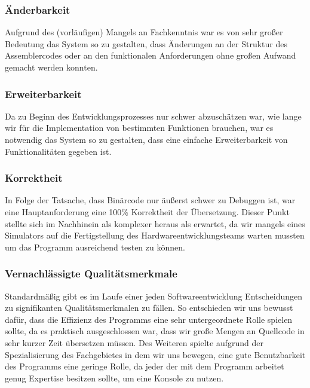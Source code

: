 \documentclass[paper=a4,fontsize=12pt]{scrreprt}
\begin{document}
\subsubsection{Änderbarkeit}
Aufgrund des (vorläufigen) Mangels an Fachkenntnis war es von sehr großer Bedeutung das System so zu gestalten, dass Änderungen an der Struktur des Assemblercodes oder an den funktionalen Anforderungen ohne großen Aufwand gemacht werden konnten. 

\subsubsection{Erweiterbarkeit}
Da zu Beginn des Entwicklungsprozesses nur schwer abzuschätzen war, wie lange wir für die Implementation von bestimmten Funktionen brauchen, war es notwendig das System so zu gestalten, dass eine einfache Erweiterbarkeit von Funktionalitäten gegeben ist. 

\subsubsection{Korrektheit}
In Folge der Tatsache, dass Binärcode nur äußerst schwer zu Debuggen ist, war eine Hauptanforderung eine 100\% Korrektheit der Übersetzung. Dieser Punkt stellte sich im Nachhinein als komplexer heraus als erwartet, da wir mangels eines Simulators auf die Fertigstellung des Hardwareentwicklungsteams warten mussten um das Programm ausreichend testen zu können. 

\subsubsection{Vernachlässigte Qualitätsmerkmale}
Standardmäßig gibt es im Laufe einer jeden Softwareentwicklung Entscheidungen zu signifikanten Qualitätsmerkmalen zu fällen. So entschieden wir uns bewusst dafür, dass die Effizienz des Programms eine sehr untergeordnete Rolle spielen sollte, da es praktisch ausgeschlossen war, dass wir große Mengen an Quellcode in sehr kurzer Zeit übersetzen müssen. Des Weiteren spielte aufgrund der Spezialisierung des Fachgebietes in dem wir uns bewegen, eine gute Benutzbarkeit des Programms eine geringe Rolle, da jeder der mit dem Programm arbeitet genug Expertise besitzen sollte, um eine Konsole zu nutzen. 
\end{document}
